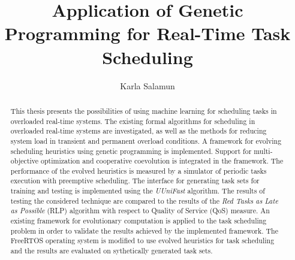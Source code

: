 \documentclass[utf8, diplomski, english, numeric]{fer}
\begin{document}

\title{Application of Genetic Programming for Real-Time Task Scheduling}

\author{Karla Salamun}

\maketitle

\izvornik

\zahvala{}

\tableofcontents
\listoffigures











\begin{abstract}
This thesis presents the possibilities of using machine learning for scheduling tasks in overloaded real-time systems.
The existing formal algorithms for scheduling in overloaded real-time systems are investigated, as well as the methods for reducing system load in transient and permanent overload conditions.
A framework for evolving scheduling heuristics using genetic programming is implemented.
Support for multi-objective optimization and cooperative coevolution is integrated in the framework.
The performance of the evolved heuristics is measured by a simulator of periodic tasks execution with preemptive scheduling.
The interface for generating task sets for training and testing is implemented using the \textit{UUniFast} algorithm.
The results of testing the considered technique are compared to the results of the \textit{Red Tasks as Late as Possible} (RLP) algorithm with respect to Quality of Service (QoS) measure.
An existing framework for evolutionary computation is applied to the task scheduling problem in order to validate the results achieved by the implemented framework.
The FreeRTOS operating system is modified to use evolved heuristics for task scheduling and the results are evaluated on sythetically generated task sets.

\end{abstract}
\end{document}
